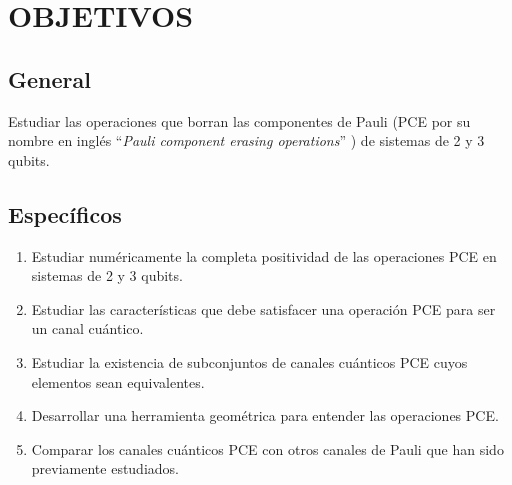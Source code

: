 \chapter{OBJETIVOS}

\section*{General}
Estudiar las operaciones que borran las componentes de Pauli (PCE por
su nombre en inglés ``\textit{Pauli component erasing operations}'' 
) de sistemas de 2 y 3 qubits.


\section*{Específicos}
\begin{enumerate}
\item Estudiar numéricamente la completa positividad de las operaciones 
PCE en sistemas de 2 y 3 qubits.

\item Estudiar las características que debe satisfacer una operación PCE
para ser un canal cuántico.

\item Estudiar la existencia de subconjuntos de canales cuánticos PCE
cuyos elementos sean equivalentes.

\item Desarrollar una herramienta geométrica para entender las
operaciones PCE.

\item Comparar los canales cuánticos PCE con otros canales de Pauli que han 
sido previamente estudiados.
\end{enumerate}

